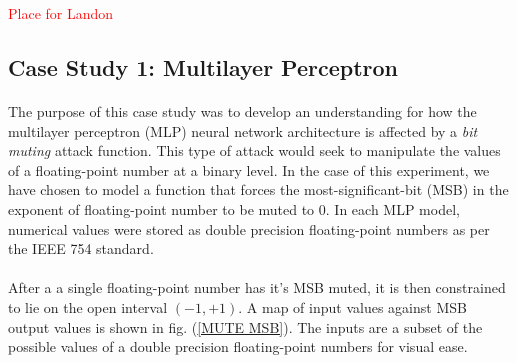 \documentclass[12pt,letterpaper]{article}
\begin{document}
\textcolor{red}{Place for Landon}

\subsection{Case Study 1: Multilayer Perceptron}

\paragraph*{}The purpose of this case study was to develop an understanding for how the multilayer perceptron (MLP) neural network architecture is affected by a \textit{bit muting} attack function. This type of attack would seek to manipulate the values of a floating-point number at a binary level. In the case of this experiment, we have chosen to model a function that forces the most-significant-bit (MSB) in the exponent of floating-point number to be muted to $0$. In each MLP model, numerical values were stored as double precision floating-point numbers as per the IEEE 754 standard.


\paragraph*{}After a a single floating-point number has it's MSB muted, it is then constrained to lie on the open interval $(-1,+1)$. A map of input values against MSB output values is shown in fig. (\ref{MUTE MSB}). The inputs are a subset of the possible values of a double precision floating-point numbers for visual ease.
\end{document}

